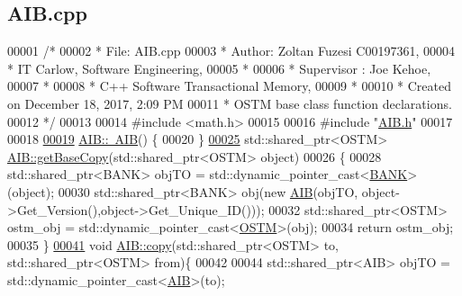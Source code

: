 \hypertarget{_a_i_b_8cpp_source}{}\subsection{A\+I\+B.\+cpp}

\begin{DoxyCode}
00001 \textcolor{comment}{/* }
00002 \textcolor{comment}{ * File:   AIB.cpp}
00003 \textcolor{comment}{ * Author: Zoltan Fuzesi C00197361, }
00004 \textcolor{comment}{ * IT Carlow, Software Engineering, }
00005 \textcolor{comment}{ *}
00006 \textcolor{comment}{ * Supervisor : Joe Kehoe, }
00007 \textcolor{comment}{ *}
00008 \textcolor{comment}{ * C++ Software Transactional Memory, }
00009 \textcolor{comment}{ * }
00010 \textcolor{comment}{ * Created on December 18, 2017, 2:09 PM}
00011 \textcolor{comment}{ * OSTM base class function declarations.}
00012 \textcolor{comment}{ */}
00013 
00014 \textcolor{preprocessor}{#include <math.h>}
00015 
00016 \textcolor{preprocessor}{#include "\hyperlink{_a_i_b_8h}{AIB.h}"}
00017 
00018 
\hypertarget{_a_i_b_8cpp_source.tex_l00019}{}\hyperlink{class_a_i_b_a22b11c50b0986326c86315957528bf79_a22b11c50b0986326c86315957528bf79}{00019} \hyperlink{class_a_i_b_a22b11c50b0986326c86315957528bf79_a22b11c50b0986326c86315957528bf79}{AIB::~AIB}() \{
00020 \}
\hypertarget{_a_i_b_8cpp_source.tex_l00025}{}\hyperlink{class_a_i_b_a987107f3d7a04790f84c1e7eeee37575_a987107f3d7a04790f84c1e7eeee37575}{00025} std::shared\_ptr<OSTM> \hyperlink{class_a_i_b_a987107f3d7a04790f84c1e7eeee37575_a987107f3d7a04790f84c1e7eeee37575}{AIB::getBaseCopy}(std::shared\_ptr<OSTM> \textcolor{keywordtype}{object})
00026 \{
00028     std::shared\_ptr<BANK> objTO = std::dynamic\_pointer\_cast<\hyperlink{class_b_a_n_k}{BANK}>(object);
00030     std::shared\_ptr<BANK> obj(\textcolor{keyword}{new} \hyperlink{class_a_i_b_a4783110463bf12f937a85b62455faf38_a4783110463bf12f937a85b62455faf38}{AIB}(objTO, object->Get\_Version(),\textcolor{keywordtype}{object}->Get\_Unique\_ID()));
00032     std::shared\_ptr<OSTM> ostm\_obj = std::dynamic\_pointer\_cast<\hyperlink{class_o_s_t_m}{OSTM}>(obj);
00034     \textcolor{keywordflow}{return} ostm\_obj;
00035 \}
\hypertarget{_a_i_b_8cpp_source.tex_l00041}{}\hyperlink{class_a_i_b_ad76f25ce86cb42028440f41c371903e0_ad76f25ce86cb42028440f41c371903e0}{00041} \textcolor{keywordtype}{void} \hyperlink{class_a_i_b_ad76f25ce86cb42028440f41c371903e0_ad76f25ce86cb42028440f41c371903e0}{AIB::copy}(std::shared\_ptr<OSTM> to, std::shared\_ptr<OSTM> from)\{
00042 
00044     std::shared\_ptr<AIB> objTO = std::dynamic\_pointer\_cast<\hyperlink{class_a_i_b}{AIB}>(to);

\end{DoxyCode}
